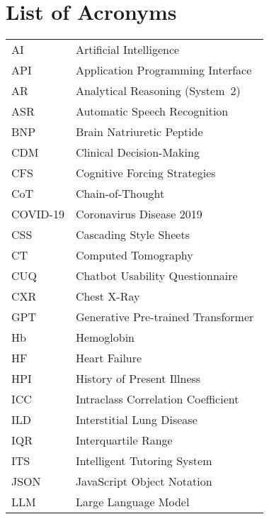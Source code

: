 \chapter*{List of Acronyms}

\begin{flushleft}
\begin{tabular}{l p{0.75\linewidth}}
AI        & Artificial Intelligence \\
API       & Application Programming Interface \\
AR        & Analytical Reasoning (System~2) \\
ASR       & Automatic Speech Recognition \\
BNP       & Brain Natriuretic Peptide \\
CDM       & Clinical Decision-Making \\
CFS       & Cognitive Forcing Strategies \\
CoT       & Chain-of-Thought \\
COVID-19  & Coronavirus Disease 2019 \\
CSS       & Cascading Style Sheets \\
CT        & Computed Tomography \\
CUQ       & Chatbot Usability Questionnaire \\
CXR       & Chest X-Ray \\
GPT       & Generative Pre-trained Transformer \\
Hb        & Hemoglobin \\
HF        & Heart Failure \\
HPI       & History of Present Illness \\
ICC       & Intraclass Correlation Coefficient \\
ILD       & Interstitial Lung Disease \\
IQR       & Interquartile Range \\
ITS       & Intelligent Tutoring System \\
JSON      & JavaScript Object Notation \\
LLM       & Large Language Model \\
\end{tabular}
\end{flushleft}

\newpage


